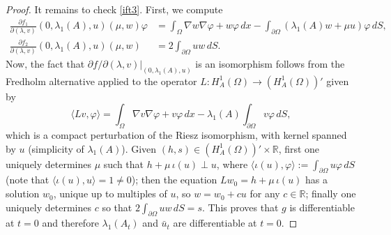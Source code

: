 \documentclass[11pt]{amsart}
\theoremstyle{remark}
\numberwithin{equation}{section}
\newcommand{\R}{\mathbb{R}}
\begin{document}
\begin{proof}
It remains to check \eqref{ift3}. First, we compute
\begin{align*}
\frac{\partial f_1}{\partial(\lambda,v)}(0,\lambda_1(A),u)(\mu,w)\varphi&=\int_\Omega\nabla w\nabla\varphi+w\varphi\,dx-\int_{\partial\Omega}(\lambda_1(A)w+\mu u)\varphi\,dS,\\
\frac{\partial f_2}{\partial(\lambda,v)}(0,\lambda_1(A),u)(\mu,w)&=2\int_{\partial\Omega}uw\,dS.
\end{align*}
Now, the fact that $\partial f/\partial(\lambda,v)|_{(0,\lambda_1(A),u)}$ is an isomorphism follows from the Fredholm alternative applied to the operator $L:H^1_A(\Omega)\to(H^1_A(\Omega))'$ given by
\[
\langle Lv,\varphi\rangle=\int_\Omega\nabla v\nabla\varphi+v\varphi\,dx-\lambda_1(A)\int_{\partial\Omega}v\varphi\,dS,
\]
which is a compact perturbation of the Riesz isomorphism, with kernel spanned by $u$ (simplicity of $\lambda_1(A)$). Given $(h,s)\in(H^1_A(\Omega))'\times\R$, first one uniquely determines $\mu$ such that $h+\mu\,\iota(u)\perp u$, where $\langle\iota(u),\varphi\rangle:=\int_{\partial\Omega}u\varphi\,dS$ (note that $\langle\iota(u),u\rangle=1\neq0$); then the equation $Lw_0=h+\mu\,\iota(u)$ has a solution $w_0$, unique up to multiples of $u$, so $w=w_0+cu$ for any $c\in\R$; finally one uniquely determines $c$ so that $2\int_{\partial\Omega}uw\,dS=s$. This proves that $g$ is differentiable at $t=0$ and therefore $\lambda_1(A_t)$ and $\bar u_t$ are differentiable at $t=0$.
\end{proof}
\end{document}
